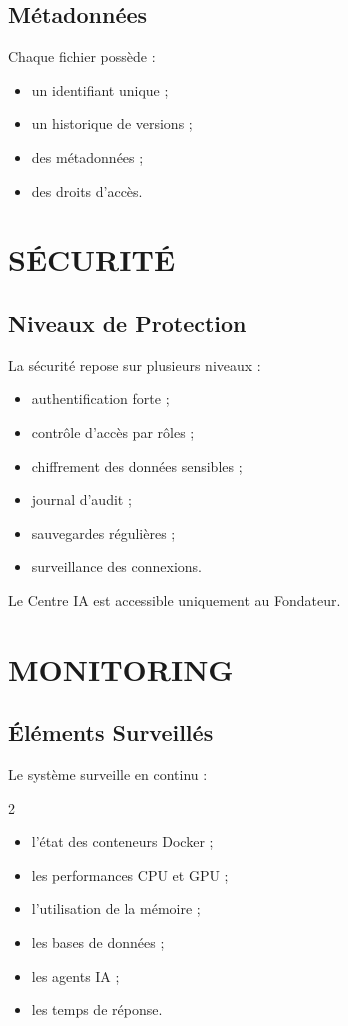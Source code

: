 \documentclass[12pt,a4paper,oneside]{book}
\begin{document}
\section{Métadonnées}
Chaque fichier possède :
\begin{itemize}
\item un identifiant unique ;
\item un historique de versions ;
\item des métadonnées ;
\item des droits d'accès.
\end{itemize}

\chapter{SÉCURITÉ}

\section{Niveaux de Protection}
La sécurité repose sur plusieurs niveaux :
\begin{itemize}
\item authentification forte ;
\item contrôle d'accès par rôles ;
\item chiffrement des données sensibles ;
\item journal d'audit ;
\item sauvegardes régulières ;
\item surveillance des connexions.
\end{itemize}

Le Centre IA est accessible uniquement au Fondateur.

\chapter{MONITORING}

\section{Éléments Surveillés}
Le système surveille en continu :
\begin{multicols}{2}
\begin{itemize}
\item l'état des conteneurs Docker ;
\item les performances CPU et GPU ;
\item l'utilisation de la mémoire ;
\item les bases de données ;
\item les agents IA ;
\item les temps de réponse.
\end{itemize}
\end{multicols}
\end{document}
